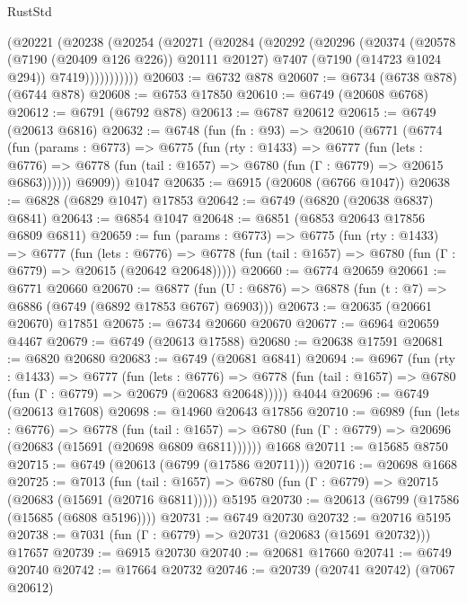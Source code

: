 \begin{lexlean}{RustStd}
\begin{coremodule}
          (@20221
            (@20238
              (@20254
                (@20271
                  (@20284
                    (@20292
                      (@20296
                        (@20374
                          (@20578 (@7190 (@20409 @126 @226)) @20111 @20127)
                          @7407
                          (@7190 (@14723 @1024 @294))
                          @7419)))))))))))
@20603 := @6732 @878
@20607 := @6734 (@6738 @878) (@6744 @878)
@20608 := @6753 @17850
@20610 := @6749 (@20608 @6768)
@20612 := @6791 (@6792 @878)
@20613 := @6787 @20612
@20615 := @6749 (@20613 @6816)
@20632 := @6748
    (fun (fn : @93) =>
    @20610
      (@6771
        (@6774
          (fun (params : @6773) =>
          @6775
            (fun (rty : @1433) =>
            @6777
              (fun (lets : @6776) =>
              @6778 (fun (tail : @1657) => @6780 (fun (Γ : @6779) => @20615 @6863))))))
        @6909))
    @1047
@20635 := @6915 (@20608 (@6766 @1047))
@20638 := @6828 (@6829 @1047) @17853
@20642 := @6749 (@6820 (@20638 @6837) @6841)
@20643 := @6854 @1047
@20648 := @6851 (@6853 @20643 @17856 @6809 @6811)
@20659 := fun (params : @6773) =>
  @6775
    (fun (rty : @1433) =>
    @6777
      (fun (lets : @6776) =>
      @6778 (fun (tail : @1657) => @6780 (fun (Γ : @6779) => @20615 (@20642 @20648)))))
@20660 := @6774 @20659
@20661 := @6771 @20660
@20670 := @6877
    (fun (U : @6876) => @6878 (fun (t : @7) => @6886 (@6749 (@6892 @17853 @6767) @6903)))
@20673 := @20635 (@20661 @20670) @17851
@20675 := @6734 @20660 @20670
@20677 := @6964 @20659 @4467
@20679 := @6749 (@20613 @17588)
@20680 := @20638 @17591
@20681 := @6820 @20680
@20683 := @6749 (@20681 @6841)
@20694 := @6967
    (fun (rty : @1433) =>
    @6777
      (fun (lets : @6776) =>
      @6778 (fun (tail : @1657) => @6780 (fun (Γ : @6779) => @20679 (@20683 @20648)))))
    @4044
@20696 := @6749 (@20613 @17608)
@20698 := @14960 @20643 @17856
@20710 := @6989
    (fun (lets : @6776) =>
    @6778
      (fun (tail : @1657) =>
      @6780 (fun (Γ : @6779) => @20696 (@20683 (@15691 (@20698 @6809 @6811))))))
    @1668
@20711 := @15685 @8750
@20715 := @6749 (@20613 (@6799 (@17586 @20711)))
@20716 := @20698 @1668
@20725 := @7013
    (fun (tail : @1657) => @6780 (fun (Γ : @6779) => @20715 (@20683 (@15691 (@20716 @6811)))))
    @5195
@20730 := @20613 (@6799 (@17586 (@15685 (@6808 @5196))))
@20731 := @6749 @20730
@20732 := @20716 @5195
@20738 := @7031 (fun (Γ : @6779) => @20731 (@20683 (@15691 @20732))) @17657
@20739 := @6915 @20730
@20740 := @20681 @17660
@20741 := @6749 @20740
@20742 := @17664 @20732
@20746 := @20739 (@20741 @20742) (@7067 @20612)

\end{coremodule}
\end{lexlean}
